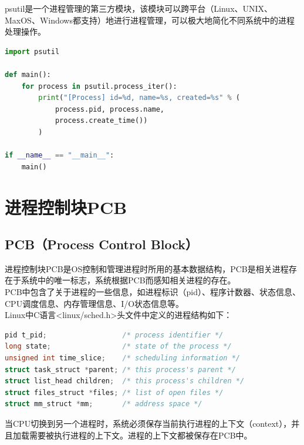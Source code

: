 psutil是一个进程管理的第三方模块，该模块可以跨平台（Linux、UNIX、MaxOS、Windows都支持）地进行进程管理，可以极大地简化不同系统中的进程处理操作。\\


\begin{lstlisting}[language=Python]
import psutil

def main():
    for process in psutil.process_iter():
        print("[Process] id=%d, name=%s, created=%s" % (
            process.pid, process.name,
            process.create_time())
        )

if __name__ == "__main__":
    main()
\end{lstlisting}

\newpage

\section{进程控制块PCB}

\subsection{PCB（Process Control Block）}

进程控制块PCB是OS控制和管理进程时所用的基本数据结构，PCB是相关进程存在于系统中的唯一标志，系统根据PCB而感知相关进程的存在。\\

PCB中包含了关于进程的一些信息，如进程标识（pid）、程序计数器、状态信息、CPU调度信息、内存管理信息、I/O状态信息等。\\

Linux中C语言<linux/sched.h>头文件中定义的进程结构如下：\\


\begin{lstlisting}[language=C]
pid t_pid;					/* process identifier */
long state;					/* state of the process */
unsigned int time_slice;	/* scheduling information */
struct task_struct *parent;	/* this process's parent */
struct list_head children;	/* this process's children */
struct files_struct *files;	/* list of open files */
struct mm_struct *mm;		/* address space */
\end{lstlisting}

当CPU切换到另一个进程时，系统必须保存当前执行进程的上下文（context），并且加载需要被执行进程的上下文。进程的上下文都被保存在PCB中。

